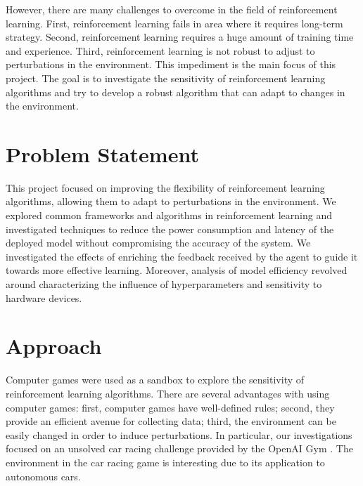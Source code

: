 However, there are many challenges to overcome in the field of reinforcement learning. First, reinforcement learning fails in area where it requires long-term strategy. Second, reinforcement learning requires a huge amount of training time and experience. Third, reinforcement learning is not robust to adjust to perturbations in the environment. This impediment is the main focus of this project. The goal is to investigate the sensitivity of reinforcement learning algorithms and try to develop a robust algorithm that can adapt to changes in the environment.

\section{Problem Statement}
This project focused on improving the flexibility of reinforcement learning algorithms, allowing them to adapt to perturbations in the environment. We explored common frameworks and algorithms in reinforcement learning and investigated techniques to reduce the power consumption and latency of the deployed model without compromising the accuracy of the system. We investigated the effects of enriching the feedback received by the agent to guide it towards more effective learning. Moreover, analysis of model efficiency revolved around characterizing the influence of hyperparameters and sensitivity to hardware devices.


\section{Approach}
Computer games were used as a sandbox to explore the sensitivity of reinforcement learning algorithms. There are several advantages with using computer games: first, computer games have well-defined rules; second, they provide an efficient avenue for collecting data; third, the environment can be easily changed in order to induce perturbations. In particular, our investigations focused on an unsolved car racing challenge provided by the OpenAI Gym \cite{brockman2016openai}. The environment in the car racing game is interesting due to its application to autonomous cars. 

